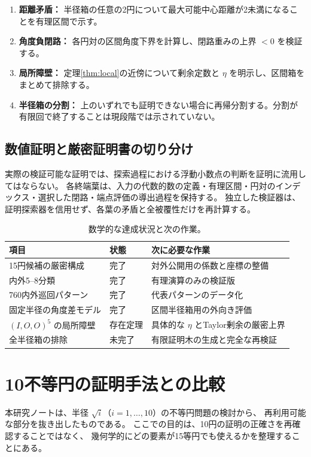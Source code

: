 \documentclass[11pt,a4paper]{article}
\theoremstyle{JPthm}
\theoremstyle{definition}
\begin{document}
\begin{enumerate}
\item \textbf{距離矛盾：} 半径箱の任意の2円について最大可能中心距離が2未満になることを有理区間で示す。
\item \textbf{角度負閉路：} 各円対の区間角度下界を計算し、閉路重みの上界 $<0$ を検証する。
\item \textbf{局所障壁：} 定理\ref{thm:local}の近傍について剰余定数と $\eta$ を明示し、区間箱をまとめて排除する。
\item \textbf{半径箱の分割：} 上のいずれでも証明できない場合に再帰分割する。分割が有限回で終了することは現段階では示されていない。
\end{enumerate}

\subsection{数値証明と厳密証明書の切り分け}
実際の検証可能な証明では、探索過程における浮動小数点の判断を証明に流用してはならない。
各終端葉は、入力の代数的数の定義・有理区間・円対のインデックス・選択した閉路・端点評価の導出過程を保持する。
独立した検証器は、証明探索器を信用せず、各葉の矛盾と全被覆性だけを再計算する。

\begin{table}[H]\centering
\caption{数学的な達成状況と次の作業。}
\begin{tabularx}{\linewidth}{@{}p{.37\linewidth}p{.18\linewidth}X@{}}
\toprule
項目 & 状態 & 次に必要な作業\\
\midrule
15円候補の厳密構成 & 完了 & 対外公開用の係数と座標の整備\\
内外5--8分類 & 完了 & 有理演算のみの検証版\\
760内外巡回パターン & 完了 & 代表パターンのデータ化\\
固定半径の角度差モデル & 完了 & 区間半径箱用の外向き評価\\
$(I,O,O)^5$ の局所障壁 & 存在定理 & 具体的な $\eta$ とTaylor剰余の厳密上界\\
全半径箱の排除 & \textcolor{alert}{未完了} & 有限証明木の生成と完全な再検証\\
\bottomrule
\end{tabularx}
\end{table}

\section{10不等円の証明手法との比較}
本研究ノートは、半径 $\sqrt{i}$（$i=1,\ldots,10$）の不等円問題の検討から、
再利用可能な部分を抜き出したものである。
ここでの目的は、10円の証明の正確さを再確認することではなく、
幾何学的にどの要素が15等円でも使えるかを整理することにある。
\end{document}
